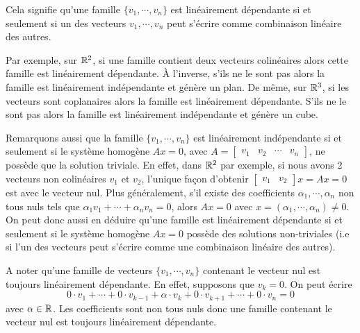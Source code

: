 \noindent Cela signifie qu'une famille $\{ {v_1},\cdots, {v_n} \}$ est linéairement dépendante si et seulement si un des vecteurs $ {v_1},\cdots, {v_n} $ peut s'écrire comme combinaison linéaire des autres.

\noindent Par exemple, sur $\mathbb{R}^2 $, si une famille contient deux vecteurs colinéaires alors cette famille est linéairement dépendante. À l'inverse, s'ils ne le sont pas alors la famille est linéairement indépendante et génère un plan. De même, sur $\mathbb{R}^3$, si les vecteurs sont coplanaires alors la famille est linéairement dépendante. S'ils ne le sont pas alors la famille est linéairement indépendante et génère un cube.

\noindent Remarquons aussi que la famille $\{ {v_1},\cdots, {v_n} \}$ est linéairement indépendante si et seulement si le système homogène $ A{x} = {0} $, avec $A = \begin{bmatrix} v_1 & v_2 & \cdots & v_n \end{bmatrix}$, ne possède que la solution triviale. En effet, dans $\mathbb{R}^2$ par exemple, si nous avons 2 vecteurs non colinéaires $v_1$ et $v_2$, l'unique façon d'obtenir $\begin{bmatrix} v_1 & v_2\end{bmatrix} x = Ax = 0$ est avec le vecteur nul. Plus généralement, s'il existe des coefficients $\alpha_1, \cdots, \alpha_n$ non tous nuls tels que $\alpha_1 v_1 + \cdots + \alpha_n v_n = 0$, alors $Ax=0$ avec $x = (\alpha_1, \cdots, \alpha_n) \neq 0$.
\newline On peut donc aussi en déduire qu'une famille est linéairement dépendante si et seulement si le système homogène $ A{x} = {0}$ possède des solutions non-triviales (i.e si l'un des vecteurs peut s'écrire comme une combinaison linéaire des autres).

\noindent A noter qu'une famille de vecteurs $\{ {v_1},\cdots, {v_n} \}$ contenant le vecteur nul est toujours linéairement dépendante. En effet, supposons que $ {v_k} = {0} $. On peut écrire
$$ 0\cdot{v_1} + \cdots + 0 \cdot {v_{k-1}} + \alpha \cdot {v_k} + 0 \cdot {v_{k+1}} + \cdots + 0 \cdot {v_n} = {0} $$
avec $ \alpha \in \mathbb{R}$. Les coefficients sont non tous nuls donc une famille contenant le vecteur nul est toujours linéairement dépendante. 


